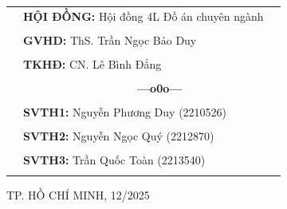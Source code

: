 \documentclass[a4paper]{article}
\theoremstyle{definition}
\begin{document}
\begin{titlepage}
\vspace{0.5cm}
\begin{table}[h]
\begin{tabular}{rll}
\hspace{6 cm} &  \textbf{\Large HỘI ĐỒNG:} {\Large Hội đồng 4L Đồ án chuyên ngành}
\\
\\
\hspace{6 cm} &   \textbf{\Large GVHD:} {\Large ThS. Trần Ngọc Bảo Duy}
\\
\\
\hspace{6 cm}  &   \textbf{\Large TKHĐ:} {\Large CN. Lê Bình Đẳng}
\\
\\
\hspace{6 cm} &     \textbf{$\;$ $\;$$\;$$\;$$\;$$\;$$\;$$\;$$\;$$\;$$\;$$\;$$\;$$\;$$\;$$\;$$\;$$\;$$\;$$\;$$\;$$\;$$\;$$\;$$\;$$\;$$\;$$\;$$\;$$\;$$\;$$\;$$\;$$\;$ \Large ---o0o---} 
\\
\\
\hspace{6 cm} &   \textbf{\Large SVTH1:} {\Large Nguyễn Phương Duy (2210526)}
\\
\\
\hspace{6 cm}&   \textbf{\Large SVTH2:}  {\Large Nguyễn Ngọc Quý (2212870)}
\\
\\
\hspace{6 cm} &   \textbf{\Large SVTH3:}  {\Large Trần Quốc Toàn (2213540)}
\\
\\
\end{tabular}
\end{table}
\vspace{0.5cm}
\begin{center}
{\Large TP. HỒ CHÍ MINH, 12/2025 }
\end{center}
\end{titlepage}
\newpage



\newpage
\tableofcontents
\newpage
\listoffigures
\newpage
\listoftables
\newpage
\setcounter{page}{1}


\newpage

\newpage

\newpage

\newpage

\newpage


\end{document}

